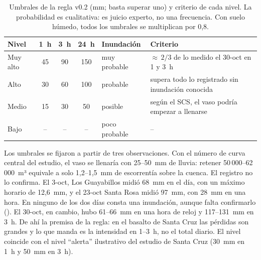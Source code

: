 \documentclass{sosg-informe}
\begin{document}
\begin{table}[ht]
  \centering\small
  \caption{Umbrales de la regla v0.2 (mm; basta superar uno) y criterio de cada nivel. La probabilidad es cualitativa: es juicio experto, no una frecuencia. Con suelo húmedo, todos los umbrales se multiplican por 0,8.}
  \label{tab:umbrales}
  \begin{tabularx}{\linewidth}{lcccl>{\raggedright\arraybackslash}X}
    \toprule
    Nivel & 1~h & 3~h & 24~h & Inundación & Criterio \\
    \midrule
    Muy alto & 45 & 90 & 150 & muy probable & ${\approx}\,2/3$ de lo medido el 30-oct en 1 y 3~h \\
    Alto & 30 & 60 & 100 & probable & supera todo lo registrado sin inundación conocida \\
    Medio & 15 & 30 & 50 & posible & según el SCS, el vaso podría empezar a llenarse \\
    Bajo & -- & -- & -- & poco probable & -- \\
    \bottomrule
  \end{tabularx}
\end{table}

Los umbrales se fijaron a partir de tres observaciones. Con el número de curva central del estudio, el vaso se llenaría con 25--50~mm de lluvia: retener 50\,000--62\,000~m³ equivale a solo 1,2--1,5~mm de escorrentía sobre la cuenca. El registro no lo confirma. El 3-oct, Los Guayabillos midió 68~mm en el día, con un máximo horario de 12,6~mm, y el 23-oct Santa Rosa midió 97~mm, con 28~mm en una hora. En ninguno de los dos días consta una inundación, aunque falta confirmarlo (). El 30-oct, en cambio, hubo 61--66~mm en una hora de reloj y 117--131~mm en 3~h. De ahí la premisa de la regla: en el basalto de Santa Cruz las pérdidas son grandes y lo que manda es la intensidad en 1--3~h, no el total diario. El nivel \alto{} coincide con el nivel \enquote{alerta} ilustrativo del estudio de Santa Cruz (30~mm en 1~h y 50~mm en 3~h).
\end{document}
